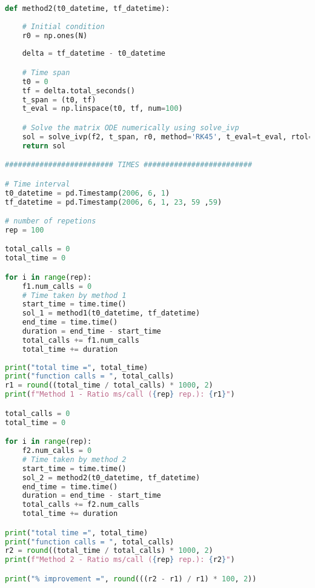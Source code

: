 \begin{lstlisting}[language=Python, caption=$\mathbf{b}(t)$ vs. $\mathbf{r}(t)$ cost comparison]
def method2(t0_datetime, tf_datetime):
    
    # Initial condition 
    r0 = np.ones(N)
    
    delta = tf_datetime - t0_datetime

    # Time span
    t0 = 0
    tf = delta.total_seconds() 
    t_span = (t0, tf) 
    t_eval = np.linspace(t0, tf, num=100)

    # Solve the matrix ODE numerically using solve_ivp
    sol = solve_ivp(f2, t_span, r0, method='RK45', t_eval=t_eval, rtol=1e-4, atol=1e-4)
    return sol

######################### TIMES #########################

# Time interval 
t0_datetime = pd.Timestamp(2006, 6, 1)
tf_datetime = pd.Timestamp(2006, 6, 1, 23, 59 ,59)

# number of repetions
rep = 100

total_calls = 0
total_time = 0

for i in range(rep):
    f1.num_calls = 0 
    # Time taken by method 1
    start_time = time.time()
    sol_1 = method1(t0_datetime, tf_datetime)
    end_time = time.time()
    duration = end_time - start_time
    total_calls += f1.num_calls
    total_time += duration
    
print("total time =", total_time)
print("function calls = ", total_calls)    
r1 = round((total_time / total_calls) * 1000, 2)   
print(f"Method 1 - Ratio ms/call ({rep} rep.): {r1}")  

total_calls = 0
total_time = 0

for i in range(rep):
    f2.num_calls = 0 
    # Time taken by method 2
    start_time = time.time()
    sol_2 = method2(t0_datetime, tf_datetime)
    end_time = time.time()
    duration = end_time - start_time
    total_calls += f2.num_calls
    total_time += duration

print("total time =", total_time)
print("function calls = ", total_calls) 
r2 = round((total_time / total_calls) * 1000, 2)
print(f"Method 2 - Ratio ms/call ({rep} rep.): {r2}") 

print("% improvement =", round(((r2 - r1) / r1) * 100, 2))
\end{lstlisting}